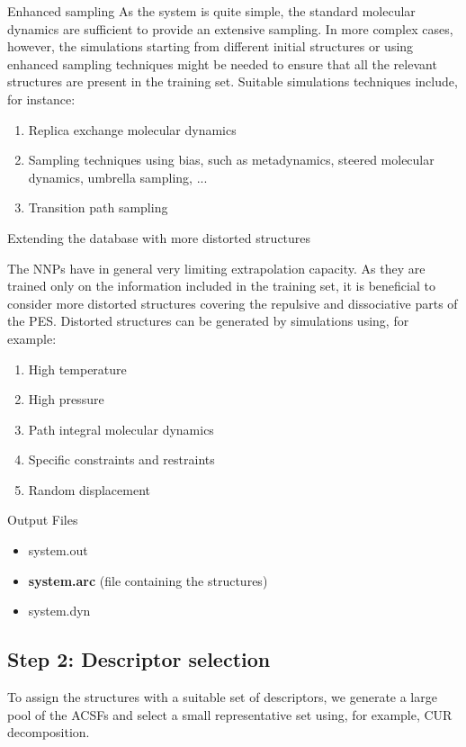 \documentclass[12pt]{article}
\newcommand\Warning{%
 \makebox[1.4em][c]{%
 \makebox[0pt][c]{\raisebox{.1em}{\small!}}%
 \makebox[0pt][c]{\color{red}\Large$\bigtriangleup$}}}%
\begin{document}
\begin{mybox1}{Enhanced sampling}
\Warning As the system is quite simple, the standard molecular dynamics are sufficient to provide an extensive sampling. In more complex cases, however, the simulations starting from different initial structures or using enhanced sampling techniques might be needed to ensure that all the relevant structures are present in the training set. Suitable simulations techniques include, for instance:
\begin{enumerate}
    \item Replica exchange molecular dynamics
    \item Sampling techniques using bias, such as metadynamics, steered molecular dynamics, umbrella sampling, ...
    \item Transition path sampling
\end{enumerate}
\end{mybox1}
\begin{mybox1}{Extending the database with more distorted structures}

\Warning The NNPs have in general very limiting extrapolation capacity. As they are trained only on the information included in the training set, it is beneficial to consider more distorted structures covering the repulsive and dissociative parts of the PES. Distorted structures can be generated by simulations using, for example: 
\begin{enumerate}
    \item High temperature
    \item High pressure
    \item Path integral molecular dynamics
    \item Specific constraints and restraints
    \item Random displacement
\end{enumerate}

\end{mybox1}
\begin{mybox3}{Output Files}
\begin{itemize}
    \item system.out
    \item \textbf{system.arc} (file containing the structures)
    \item system.dyn
\end{itemize}
\end{mybox3}
%
\subsection{Step 2: Descriptor selection}
To assign the structures with a suitable set of descriptors, we generate a large pool of the ACSFs and select a small representative set using, for example, CUR decomposition.
\end{document}
